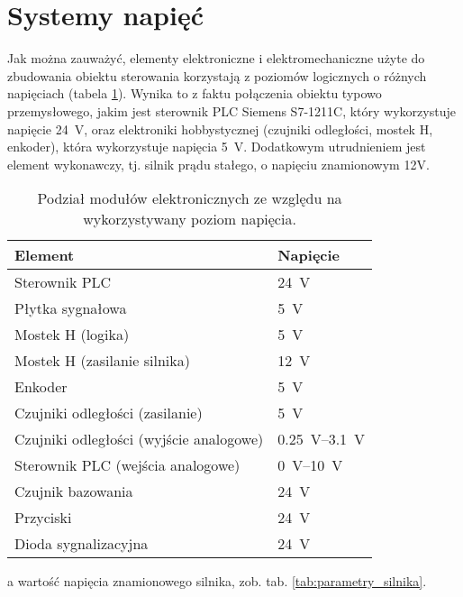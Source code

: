 \section{Systemy napięć}
\label{sec:ch3_systemy_napiec}

Jak można zauważyć, elementy elektroniczne i elektromechaniczne użyte do zbudowania obiektu sterowania korzystają z poziomów logicznych o różnych napięciach (tabela \ref{tab:poziomy_napiec}). Wynika to z faktu połączenia obiektu typowo przemysłowego, jakim jest sterownik PLC Siemens S7-1211C, który wykorzystuje napięcie \SI{24}{\volt}, oraz elektroniki hobbystycznej (czujniki odległości, mostek H, enkoder), która wykorzystuje napięcia \SI{5}{\volt}. Dodatkowym utrudnieniem jest element wykonawczy, tj. silnik prądu stałego, o napięciu znamionowym 12V.

\begin{table}[h]
    \centering
    \begin{threeparttable}
        \caption{Podział modułów elektronicznych ze względu na wykorzystywany poziom napięcia.}
        \label{tab:poziomy_napiec}
        
        \begin{tabularx}{0.6\textwidth}{l | l}
            \toprule
            Element & Napięcie \\
            \midrule
            Sterownik PLC & \SI{24}{\volt} \\
            Płytka sygnałowa & \SI{5}{\volt} \\
            Mostek H (logika) & \SI{5}{\volt} \\
            Mostek H (zasilanie silnika)\tnote{a} & \SI{12}{\volt} \\
            Enkoder & \SI{5}{\volt} \\
            Czujniki odległości (zasilanie) & \SI{5}{\volt} \\
            Czujniki odległości (wyjście analogowe) & \SIrange{0,25}{3,1}{\volt} \\
            Sterownik PLC (wejścia analogowe) & \SIrange{0}{10}{\volt} \\
            Czujnik bazowania & \SI{24}{\volt} \\
            Przyciski & \SI{24}{\volt} \\
            Dioda sygnalizacyjna & \SI{24}{\volt} \\
            \bottomrule
        \end{tabularx}
        
        \begin{tablenotes}
            \footnotesize
            \item[a] wartość napięcia znamionowego silnika, zob. tab. \ref{tab:parametry_silnika}.
        \end{tablenotes}
    \end{threeparttable}
\end{table}

